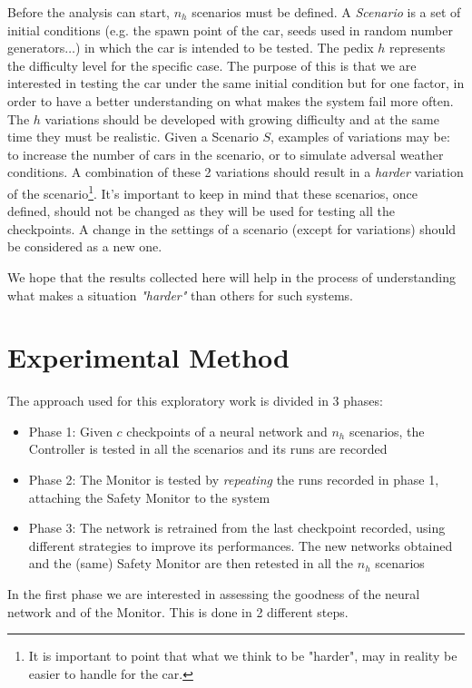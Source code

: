 Before the analysis can start, $n_{h}$ scenarios must be defined. A \textsl{Scenario} is a set of initial conditions (e.g. the spawn point of the car, seeds used in random number generators$\dots$) in which the car is intended to be tested. The pedix $h$ represents the difficulty level for the specific case. The purpose of this is that we are interested in testing the car under the same initial condition but for one factor, in order to have a better understanding on what makes the system fail more often. The $h$ variations should be developed with growing difficulty and at the same time they must be realistic. Given a Scenario $S$, examples of variations may be: to increase the number of cars in the scenario, or to simulate adversal weather conditions. A combination of these 2 variations should result in a \textsl{harder} variation of the scenario\footnote{It is important to point that what we think to be "harder", may in reality be easier to handle for the car.}. It's important to keep in mind that these scenarios, once defined, should not be changed as they will be used for testing all the checkpoints. A change in the settings of a scenario (except for variations) should be considered as a new one.

We hope that the results collected here will help in the process of understanding what makes a situation \textsl{"harder"} than others for such systems.

\section{Experimental Method}

The approach used for this exploratory work is divided in 3 phases:

\begin{itemize}
	\item Phase 1: Given $c$ checkpoints of a neural network and $n_{h}$ scenarios, the Controller is tested in all the scenarios and its runs are recorded
	\item Phase 2: The Monitor is tested by \textsl{repeating} the runs recorded in phase 1, attaching the Safety Monitor to the system
	\item Phase 3: The network is retrained from the last checkpoint recorded, using different strategies to improve its performances. The new networks obtained and the (same) Safety Monitor are then retested in all the $n_{h}$ scenarios
\end{itemize}


In the first phase we are interested in assessing the goodness of the neural network and of the Monitor. This is done in 2 different steps. 

